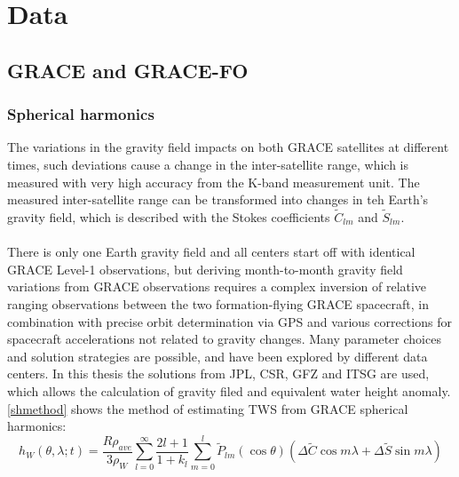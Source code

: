 
\chapter{Data}
\section{GRACE and GRACE-FO}
\subsection{Spherical harmonics}
The variations in the gravity field impacts on both GRACE satellites at different times, such deviations cause a change in the inter-satellite range, which is measured with very high accuracy from the K-band measurement unit. The measured inter-satellite range can be transformed into changes in teh Earth's gravity field, which is described with the Stokes coefficients $\tilde{C}_{lm}$ and $\tilde{S}_{lm}$.\\\\
There is only one Earth gravity field and all centers start off with identical GRACE Level-1 observations, but deriving month-to-month gravity field variations from GRACE observations requires a complex inversion of relative ranging observations between the two formation-flying GRACE spacecraft, in combination with precise orbit determination via GPS and various corrections for spacecraft accelerations not related to gravity changes. Many parameter choices and solution strategies are possible, and have been explored by different data centers. In this thesis the solutions from JPL, CSR, GFZ and ITSG are used, which allows the calculation of gravity filed and equivalent water height anomaly. \autoref{shmethod} shows the method of estimating TWS from GRACE spherical harmonics: 
\begin{equation}
h_{W}(\theta,\lambda;t) = \frac{R \rho_{ave}}{3\rho_{W}} \sum_{l=0}^{\infty} \frac{2l+1}{1+k_{l}} \sum_{m=0}^{l} \tilde{P}_{lm} (\cos \theta) (\Delta \tilde{C} \cos m \lambda + \Delta \tilde{S} \sin m \lambda)
\end{equation}
